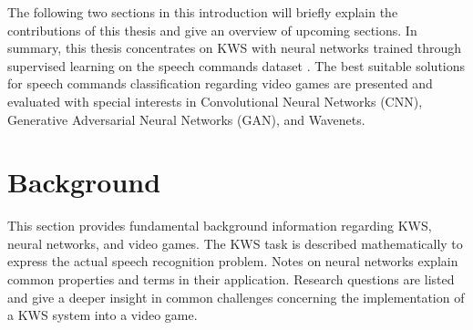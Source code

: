 The following two sections in this introduction will briefly explain the contributions of this thesis and give an overview of upcoming sections.
In summary, this thesis concentrates on KWS with neural networks trained through supervised learning on the speech commands dataset \cite{Warden2018}.
The best suitable solutions for speech commands classification regarding video games are presented and evaluated with special interests in Convolutional Neural Networks (CNN), Generative Adversarial Neural Networks (GAN), and Wavenets.







\chapter{Background}\label{sec:back}
This section provides fundamental background information regarding KWS, neural networks, and video games.
The KWS task is described mathematically to express the actual speech recognition problem.
Notes on neural networks explain common properties and terms in their application.
Research questions are listed and give a deeper insight in common challenges concerning the implementation of a KWS system into a video game.





